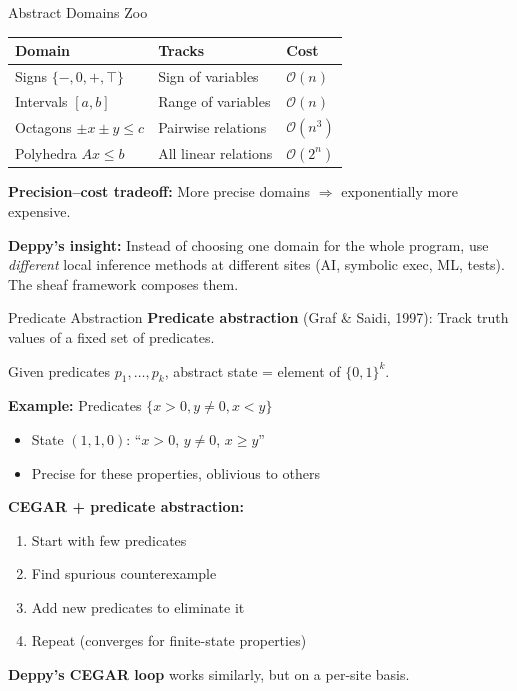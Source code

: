 \documentclass[aspectratio=169,10pt]{beamer}
\begin{document}
\begin{frame}{Abstract Domains Zoo}
\renewcommand{\arraystretch}{1.3}
\begin{tabular}{@{}lll@{}}
\toprule
\textbf{Domain} & \textbf{Tracks} & \textbf{Cost} \\
\midrule
Signs $\{-, 0, +, \top\}$ & Sign of variables & $\mathcal{O}(n)$ \\
Intervals $[a, b]$ & Range of variables & $\mathcal{O}(n)$ \\
Octagons $\pm x \pm y \leq c$ & Pairwise relations & $\mathcal{O}(n^3)$ \\
Polyhedra $Ax \leq b$ & All linear relations & $\mathcal{O}(2^n)$ \\
\bottomrule
\end{tabular}

\vspace{0.5em}
\textbf{Precision--cost tradeoff:} More precise domains $\Rightarrow$ exponentially more expensive.

\textbf{Deppy's insight:} Instead of choosing one domain for the whole program, use \emph{different} local inference methods at different sites (AI, symbolic exec, ML, tests). The sheaf framework composes them.
\end{frame}

\begin{frame}{Predicate Abstraction}
\textbf{Predicate abstraction} (Graf \& Saidi, 1997): Track truth values of a fixed set of predicates.

\vspace{0.3em}
Given predicates $p_1, \ldots, p_k$, abstract state = element of $\{0,1\}^k$.

\textbf{Example:} Predicates $\{x > 0, y \neq 0, x < y\}$
\begin{itemize}
  \item State $(1, 1, 0)$: ``$x > 0$, $y \neq 0$, $x \geq y$''
  \item Precise for these properties, oblivious to others
\end{itemize}

\vspace{0.3em}
\textbf{CEGAR + predicate abstraction:}
\begin{enumerate}
  \item Start with few predicates
  \item Find spurious counterexample
  \item Add new predicates to eliminate it
  \item Repeat (converges for finite-state properties)
\end{enumerate}

\textbf{Deppy's CEGAR loop} works similarly, but on a per-site basis.
\end{frame}
\end{document}
